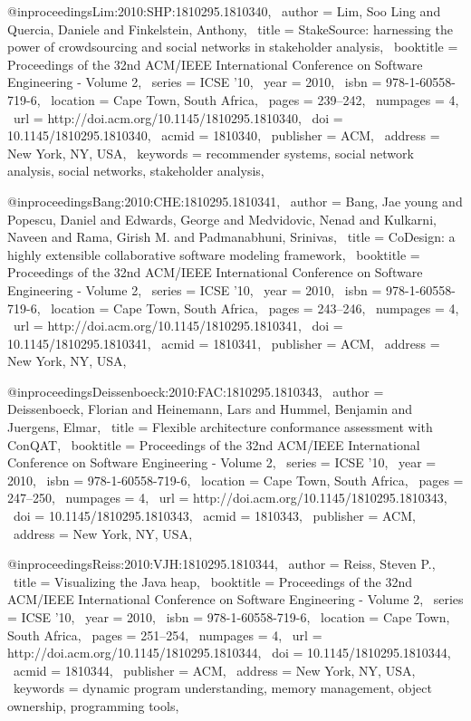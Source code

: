 @inproceedings{Lim:2010:SHP:1810295.1810340,
 author = {Lim, Soo Ling and Quercia, Daniele and Finkelstein, Anthony},
 title = {StakeSource: harnessing the power of crowdsourcing and social networks in stakeholder analysis},
 booktitle = {Proceedings of the 32nd ACM/IEEE International Conference on Software Engineering - Volume 2},
 series = {ICSE '10},
 year = {2010},
 isbn = {978-1-60558-719-6},
 location = {Cape Town, South Africa},
 pages = {239--242},
 numpages = {4},
 url = {http://doi.acm.org/10.1145/1810295.1810340},
 doi = {10.1145/1810295.1810340},
 acmid = {1810340},
 publisher = {ACM},
 address = {New York, NY, USA},
 keywords = {recommender systems, social network analysis, social networks, stakeholder analysis},
} 

@inproceedings{Bang:2010:CHE:1810295.1810341,
 author = {Bang, Jae young and Popescu, Daniel and Edwards, George and Medvidovic, Nenad and Kulkarni, Naveen and Rama, Girish M. and Padmanabhuni, Srinivas},
 title = {CoDesign: a highly extensible collaborative software modeling framework},
 booktitle = {Proceedings of the 32nd ACM/IEEE International Conference on Software Engineering - Volume 2},
 series = {ICSE '10},
 year = {2010},
 isbn = {978-1-60558-719-6},
 location = {Cape Town, South Africa},
 pages = {243--246},
 numpages = {4},
 url = {http://doi.acm.org/10.1145/1810295.1810341},
 doi = {10.1145/1810295.1810341},
 acmid = {1810341},
 publisher = {ACM},
 address = {New York, NY, USA},
} 

@inproceedings{Deissenboeck:2010:FAC:1810295.1810343,
 author = {Deissenboeck, Florian and Heinemann, Lars and Hummel, Benjamin and Juergens, Elmar},
 title = {Flexible architecture conformance assessment with ConQAT},
 booktitle = {Proceedings of the 32nd ACM/IEEE International Conference on Software Engineering - Volume 2},
 series = {ICSE '10},
 year = {2010},
 isbn = {978-1-60558-719-6},
 location = {Cape Town, South Africa},
 pages = {247--250},
 numpages = {4},
 url = {http://doi.acm.org/10.1145/1810295.1810343},
 doi = {10.1145/1810295.1810343},
 acmid = {1810343},
 publisher = {ACM},
 address = {New York, NY, USA},
} 

@inproceedings{Reiss:2010:VJH:1810295.1810344,
 author = {Reiss, Steven P.},
 title = {Visualizing the Java heap},
 booktitle = {Proceedings of the 32nd ACM/IEEE International Conference on Software Engineering - Volume 2},
 series = {ICSE '10},
 year = {2010},
 isbn = {978-1-60558-719-6},
 location = {Cape Town, South Africa},
 pages = {251--254},
 numpages = {4},
 url = {http://doi.acm.org/10.1145/1810295.1810344},
 doi = {10.1145/1810295.1810344},
 acmid = {1810344},
 publisher = {ACM},
 address = {New York, NY, USA},
 keywords = {dynamic program understanding, memory management, object ownership, programming tools},
} 


